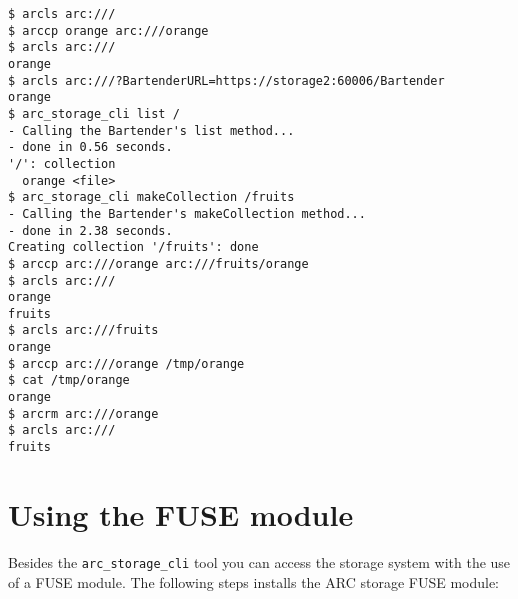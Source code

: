 \documentclass{article}
\begin{document}
\begin{verbatim}
$ arcls arc:///
$ arccp orange arc:///orange
$ arcls arc:///
orange
$ arcls arc:///?BartenderURL=https://storage2:60006/Bartender
orange
$ arc_storage_cli list /
- Calling the Bartender's list method...
- done in 0.56 seconds.
'/': collection
  orange <file>
$ arc_storage_cli makeCollection /fruits
- Calling the Bartender's makeCollection method...
- done in 2.38 seconds.
Creating collection '/fruits': done
$ arccp arc:///orange arc:///fruits/orange
$ arcls arc:///
orange
fruits
$ arcls arc:///fruits
orange
$ arccp arc:///orange /tmp/orange
$ cat /tmp/orange 
orange
$ arcrm arc:///orange
$ arcls arc:///
fruits
\end{verbatim}

\section{Using the FUSE module} %
\label{sec:using_the_fuse_module}

Besides the \verb!arc_storage_cli! tool you can access the storage system with the use of a FUSE module. The following steps installs the ARC storage FUSE module:
\end{document}
